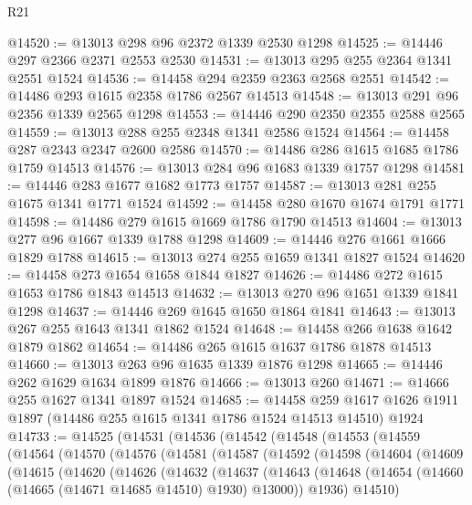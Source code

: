 \begin{lexlean}{R21}
\begin{coremodule}
@14520 := @13013 @298 @96 @2372 @1339 @2530 @1298
@14525 := @14446 @297 @2366 @2371 @2553 @2530
@14531 := @13013 @295 @255 @2364 @1341 @2551 @1524
@14536 := @14458 @294 @2359 @2363 @2568 @2551
@14542 := @14486 @293 @1615 @2358 @1786 @2567 @14513
@14548 := @13013 @291 @96 @2356 @1339 @2565 @1298
@14553 := @14446 @290 @2350 @2355 @2588 @2565
@14559 := @13013 @288 @255 @2348 @1341 @2586 @1524
@14564 := @14458 @287 @2343 @2347 @2600 @2586
@14570 := @14486 @286 @1615 @1685 @1786 @1759 @14513
@14576 := @13013 @284 @96 @1683 @1339 @1757 @1298
@14581 := @14446 @283 @1677 @1682 @1773 @1757
@14587 := @13013 @281 @255 @1675 @1341 @1771 @1524
@14592 := @14458 @280 @1670 @1674 @1791 @1771
@14598 := @14486 @279 @1615 @1669 @1786 @1790 @14513
@14604 := @13013 @277 @96 @1667 @1339 @1788 @1298
@14609 := @14446 @276 @1661 @1666 @1829 @1788
@14615 := @13013 @274 @255 @1659 @1341 @1827 @1524
@14620 := @14458 @273 @1654 @1658 @1844 @1827
@14626 := @14486 @272 @1615 @1653 @1786 @1843 @14513
@14632 := @13013 @270 @96 @1651 @1339 @1841 @1298
@14637 := @14446 @269 @1645 @1650 @1864 @1841
@14643 := @13013 @267 @255 @1643 @1341 @1862 @1524
@14648 := @14458 @266 @1638 @1642 @1879 @1862
@14654 := @14486 @265 @1615 @1637 @1786 @1878 @14513
@14660 := @13013 @263 @96 @1635 @1339 @1876 @1298
@14665 := @14446 @262 @1629 @1634 @1899 @1876
@14666 := @13013 @260
@14671 := @14666 @255 @1627 @1341 @1897 @1524
@14685 := @14458
    @259
    @1617
    @1626
    @1911
    @1897
    (@14486 @255 @1615 @1341 @1786 @1524 @14513 @14510)
    @1924
@14733 := @14525
    (@14531
      (@14536
        (@14542
          (@14548
            (@14553
              (@14559
                (@14564
                  (@14570
                    (@14576
                      (@14581
                        (@14587
                          (@14592
                            (@14598
                              (@14604
                                (@14609
                                  (@14615
                                    (@14620
                                      (@14626
                                        (@14632
                                          (@14637
                                            (@14643
                                              (@14648
                                                (@14654
                                                  (@14660
                                                    (@14665 (@14671 @14685 @14510) @1930)
                                                    @13000))
                                                @1936)
                                              @14510)

\end{coremodule}
\end{lexlean}
